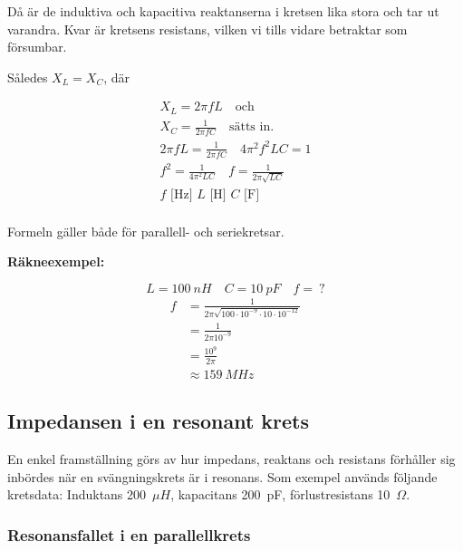 Då är de induktiva och kapacitiva reaktanserna i kretsen lika stora och tar ut
varandra.
Kvar är kretsens resistans, vilken vi tills vidare betraktar som försumbar.

Således \(X_L = X_C\), där

\begin{gather*}
  X_L = 2\pi fL \quad \text{och} \\
  X_C = \frac{1}{2\pi fC} \quad \text{sätts in.} \\
  2\pi fL = \frac{1}{2\pi fC} \quad 4\pi ^2f^2LC = 1 \\
  f^2 = \frac{1}{4\pi ^2LC} \quad f = \frac{1}{2\pi \sqrt{LC}} \\
  f\text{ [Hz] }L\text{ [H] }C\text{ [F] } \\
\end{gather*}

Formeln gäller både för parallell- och seriekretsar.

\textbf{Räkneexempel:}

\[L = 100\ nH \quad C = 10\ pF \quad f =\ ?\]
\begin{align*}
  f &= \frac{1}{2\pi \sqrt{100 \cdot 10^{-9} \cdot 10 \cdot 10^{-12}}} \\
  &= \frac{1}{2\pi 10^{-9}} \\
  &= \frac{10^9}{2\pi } \\
  &\approx 159\ MHz
\end{align*}

\subsection{Impedansen i en resonant krets}

En enkel framställning görs av hur impedans, reaktans och resistans förhåller
sig inbördes när en svängningskrets är i resonans.
Som exempel används följande kretsdata: Induktans 200~\(\mu H\),
kapacitans 200~pF, förlustresistans 10~\(\Omega\).

\subsubsection{Resonansfallet i en parallellkrets}
\label{parallellresonans}

